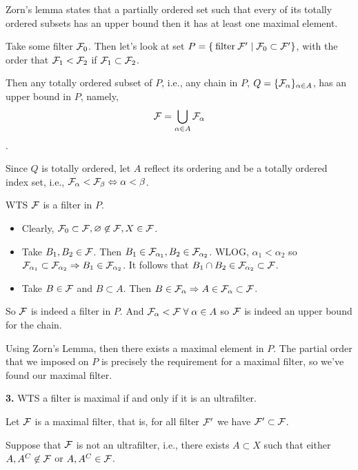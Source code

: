 \documentclass[a4paper, 10pt]{article}
\begin{document}
\begin{solution}
    Zorn's lemma states that a partially ordered set such that every of its totally ordered subsets has an upper bound then it has at least one maximal element.

    Take some filter $\mathcal{F}_0$. Then let's look at set $P = \{\:\text{filter}\: \mathcal{F}' \mid \mathcal{F}_0 \subset \mathcal{F}'\}$, with the order that $\mathcal{F}_1 < \mathcal{F}_2$ if $\mathcal{F}_1 \subset \mathcal{F}_2$.

    Then any totally ordered subset of $P$, i.e., any chain in $P$, $Q = \{\mathcal{F}_{\alpha}\}_{\alpha \in A}$, has an upper bound in $P$, namely, \begin{equation*}
    \mathcal{F} = \bigcup_{\alpha \in A} \mathcal{F}_{\alpha}
    \end{equation*}.

    Since $Q$ is totally ordered, let $A$ reflect its ordering and be a totally ordered index set, i.e., $\mathcal{F}_\alpha < \mathcal{F}_\beta \Leftrightarrow \alpha < \beta$.

    WTS $\mathcal{F}$ is a filter in $P$. \begin{itemize}
    \item Clearly, $\mathcal{F}_0 \subset \mathcal{F}, \varnothing \not \in \mathcal{F}, X \in \mathcal{F}$. 
    \item  Take $B_1, B_2 \in \mathcal{F}$. Then $B_1 \in \mathcal{F}_{\alpha_1}, B_2 \in \mathcal{F}_{\alpha_2}$. WLOG, $\alpha_1 < \alpha_2$ so $\mathcal{F}_{\alpha_1} \subset \mathcal{F}_{\alpha_2} \Rightarrow B_1 \in \mathcal{F}_{\alpha_2}$. It follows that $B_1 \cap B_2 \in \mathcal{F}_{\alpha_2} \subset \mathcal{F}$.
    \item Take $B \in \mathcal{F}$ and $B \subset A$. Then $ B \in \mathcal{F}_{\alpha} \Rightarrow A \in \mathcal{F}_\alpha \subset \mathcal{F}$.
    \end{itemize}
    
    So $\mathcal{F}$ is indeed a filter in $P$. And $\calf_\alpha < \calf \forall \alpha \in A$ so $\mathcal{F}$ is indeed an upper bound for the chain.

    Using Zorn's Lemma, then there exists a maximal element in $P$. The partial order that we imposed on $P$ is precisely the requirement for a maximal filter, so we've found our maximal filter.

    \textbf{3.} WTS a filter is maximal if and only if it is an ultrafilter.
    
    \pffwd Let $\mathcal{F}$ is a maximal filter, that is, for all filter $\mathcal{F}'$ we have $\mathcal{F}' \subset \mathcal{F}$.

    Suppose that $\mathcal{F}$ is not an ultrafilter, i.e., there exists $A \subset X$ such that either $A, A^C \not \in \mathcal{F}$ or $A, A^C \in \mathcal{F}$.


\end{solution}
\end{document}
